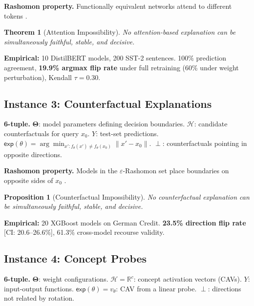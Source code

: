 \documentclass{article}
\newtheorem{theorem}{Theorem}
\newtheorem{proposition}{Proposition}
\newcommand{\R}{\mathbb{R}}
\newcommand{\Params}{\mathbf{\Theta}}
\newcommand{\sH}{\mathcal{H}}
\newcommand{\incomp}{\perp}
\begin{document}
\textbf{Rashomon property.}
Functionally equivalent networks attend to different tokens \citep{jainwallace2019,damour2022underspecification}.

\begin{theorem}[Attention Impossibility]
No attention-based explanation can be simultaneously faithful, stable, and decisive.
\end{theorem}

\textbf{Empirical:} 10 DistilBERT models, 200 SST-2 sentences. 100\% prediction agreement, \textbf{19.9\% argmax flip rate} under full retraining (60\% under weight perturbation), Kendall $\tau = 0.30$.

\subsection{Instance 3: Counterfactual Explanations}
\label{sec:inst-cf}

\textbf{6-tuple.}
$\Params$: model parameters defining decision boundaries.
$\sH$: candidate counterfactuals for query $x_0$.
$Y$: test-set predictions.
$\mathsf{exp}(\theta) = \arg\min_{x': f_\theta(x') \neq f_\theta(x_0)} \|x' - x_0\|$.
$\incomp$: counterfactuals pointing in opposite directions.

\textbf{Rashomon property.}
Models in the $\varepsilon$-Rashomon set place boundaries on opposite sides of $x_0$ \citep{semenova2022existence}.

\begin{proposition}[Counterfactual Impossibility]
No counterfactual explanation can be simultaneously faithful, stable, and decisive.
\end{proposition}

\textbf{Empirical:} 20 XGBoost models on German Credit. \textbf{23.5\% direction flip rate} [CI: 20.6--26.6\%], 61.3\% cross-model recourse validity.

\subsection{Instance 4: Concept Probes}
\label{sec:inst-concept}

\textbf{6-tuple.}
$\Params$: weight configurations.
$\sH = \R^c$: concept activation vectors (CAVs).
$Y$: input-output functions.
$\mathsf{exp}(\theta) = v_\theta$: CAV from a linear probe.
$\incomp$: directions not related by rotation.
\end{document}
